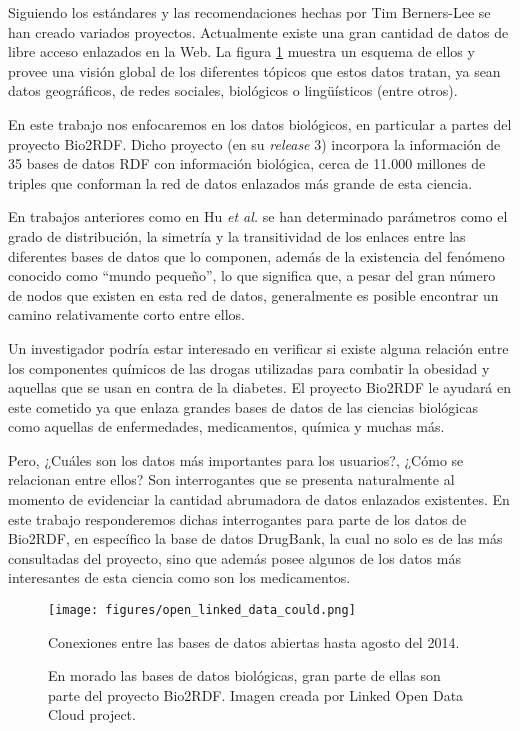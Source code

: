 Siguiendo los estándares y las recomendaciones hechas por Tim Berners-Lee se han
creado variados proyectos.
Actualmente existe una gran cantidad de datos de libre acceso enlazados en la
Web. La figura \ref{fig:cloud} muestra un esquema de ellos y provee una visión
global de los diferentes tópicos que estos datos tratan, ya sean datos
geográficos, de redes sociales, biológicos o lingüísticos (entre otros).

En este trabajo nos enfocaremos en los datos biológicos, en particular a partes
del proyecto Bio2RDF\cite{belleau2008bio2rdf}.
Dicho proyecto (en su \emph{release} 3) incorpora la información de 35 bases de
datos RDF con información biológica, cerca de 11.000 millones de triples que
conforman la red de datos enlazados más grande de esta ciencia.

En trabajos anteriores como en Hu \emph{et al.}\cite{hu2015link} se han
determinado parámetros como el grado de distribución, la simetría y la
transitividad de los enlaces entre las diferentes bases de datos que lo
componen, además de la existencia del fenómeno conocido como ``mundo pequeño'',
lo que significa que, a pesar del gran número de nodos que existen en esta red
de datos, generalmente es posible encontrar un camino relativamente corto entre
ellos.

Un investigador podría estar interesado en verificar si existe alguna relación
entre los componentes químicos de las drogas utilizadas para combatir la
obesidad y aquellas que se usan en contra de la diabetes.
El proyecto Bio2RDF le ayudará en este cometido ya que enlaza grandes bases de
datos de las ciencias biológicas como aquellas de enfermedades, medicamentos,
química y muchas más.

Pero, ¿Cuáles son los datos más importantes para los usuarios?, ¿Cómo se
relacionan entre ellos? Son interrogantes que se presenta naturalmente al
momento de evidenciar la cantidad abrumadora de datos enlazados existentes.
En este trabajo responderemos dichas interrogantes para parte de los datos de
Bio2RDF, en específico la base de datos DrugBank, la cual no solo es de las más
consultadas del proyecto, sino que además posee algunos de los datos más
interesantes de esta ciencia como son los medicamentos.

\begin{figure}[ht]
  \centering
  \texttt{[image: figures/open\_linked\_data\_could.png]}
  \caption{Conexiones entre las bases de datos abiertas hasta agosto del 2014.}
  \vspace{-.2cm}
  \caption*{\small
    En morado las bases de datos biológicas, gran parte de ellas son parte del
    proyecto Bio2RDF.
    Imagen creada por Linked Open Data Cloud project\cite{lod:cloud}.}
  \label{fig:cloud}
\end{figure}
~\vspace{-1cm}

